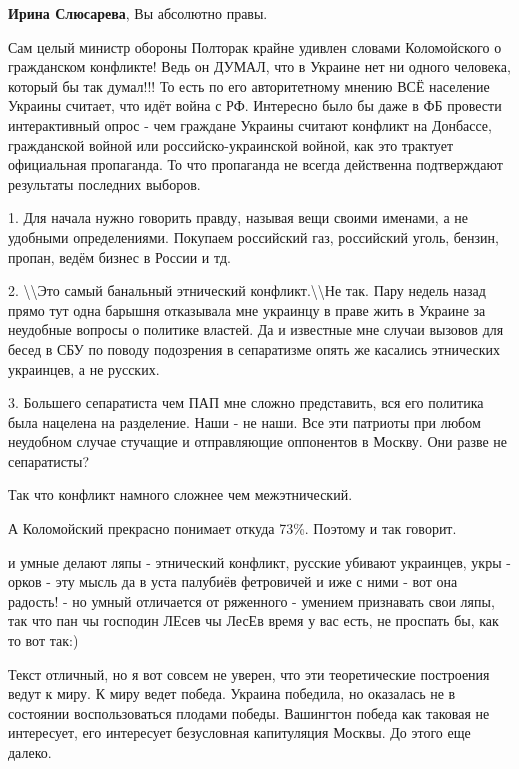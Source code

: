 \begin{itemize}
\begin{itemize}
\textbf{Ирина Слюсарева}, Вы абсолютно правы.
\end{itemize} %


Сам целый министр обороны Полторак крайне удивлен словами Коломойского о
гражданском конфликте! Ведь он ДУМАЛ, что в Украине нет ни одного человека,
который бы так думал!!! То есть по его авторитетному мнению ВСЁ население
Украины считает, что идёт война с РФ. Интересно было бы даже в ФБ провести
интерактивный опрос - чем граждане Украины считают конфликт на Донбассе,
гражданской войной или российско-украинской войной, как это трактует
официальная пропаганда. То что пропаганда не всегда действенна подтверждают
результаты последних выборов.


1. Для начала нужно говорить правду, называя вещи своими именами, а не удобными
определениями. Покупаем российский газ, российский уголь, бензин, пропан, ведём
бизнес в России и тд.

2. \textbackslash\textbackslash Это самый банальный этнический
конфликт.\textbackslash\textbackslash Не так. Пару недель назад прямо тут одна
барышня отказывала мне украинцу в праве жить в Украине за неудобные вопросы о
политике властей. Да и известные мне случаи вызовов для бесед в СБУ по поводу
подозрения в сепаратизме опять же касались этнических украинцев, а не русских.

3. Большего сепаратиста чем ПАП мне сложно представить, вся его политика была
нацелена на разделение. Наши - не наши. Все эти патриоты при любом неудобном
случае стучащие и отправляющие оппонентов в Москву. Они разве не сепаратисты?

Так что конфликт намного сложнее чем межэтнический.

А Коломойский прекрасно понимает откуда 73\%. Поэтому и так говорит.


и умные делают ляпы - этнический конфликт, русские убивают украинцев, укры -
орков - эту мысль да в уста палубиёв фетровичей и иже с ними - вот она радость!
- но умный отличается от ряженного - умением признавать свои ляпы, так что пан
чы господин ЛЕсев чы ЛесЕв время у вас есть, не проспать бы, как то вот так:)


Текст отличный, но я вот совсем не уверен, что эти теоретические построения
ведут к миру. К миру ведет победа. Украина победила, но оказалась не в
состоянии воспользоваться плодами победы. Вашингтон победа как таковая не
интересует, его интересует безусловная капитуляция Москвы. До этого еще далеко.


\end{itemize}
